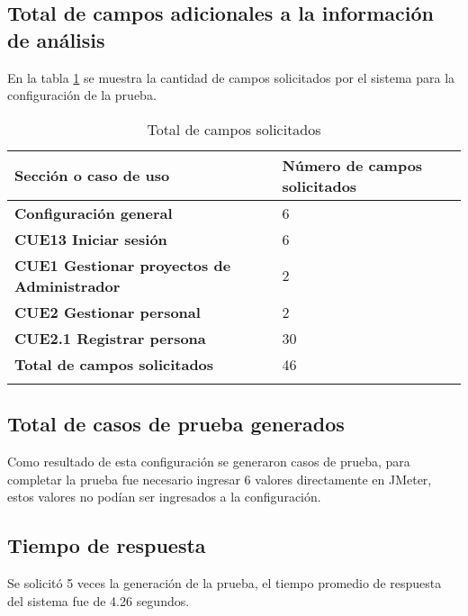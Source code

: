 \subsection*{Total de campos adicionales a la información de análisis}
En la tabla \ref{tabla:resultadosCURegistrarPersona} se muestra la cantidad de campos solicitados por el sistema para la configuración de la prueba.


\begin{longtable}{| p{} | p{} |}%
	\arrayrulecolor{black}%
	\rowcolor{black}%
	{\color{white}Sección o caso de uso} & {\color{white}Número de campos solicitados} \\ \hline
	\endhead%
	\arrayrulecolor{black}%
	{\bf Configuración general} & 6 \\ \hline
	{\bf CUE13 Iniciar sesión} & 6 \\ \hline
	{\bf CUE1 Gestionar proyectos de Administrador} & 2 \\ \hline
	{\bf CUE2 Gestionar personal} & 2 \\ \hline
	{\bf CUE2.1 Registrar persona} & 30 \\ \hline
	{\bf Total de campos solicitados} & 46 \\ \hline
	\caption{Total de campos solicitados}\label{tabla:resultadosCURegistrarPersona}
\end{longtable}

\subsection*{Total de casos de prueba generados}
Como resultado de esta configuración se generaron \totalCasosPruebaCURegistrarPersona casos de prueba, para completar la prueba
fue necesario ingresar 6 valores directamente en JMeter, estos valores no podían ser ingresados a la configuración. 

\subsection*{Tiempo de respuesta}
Se solicitó 5 veces la generación de la prueba, el tiempo promedio de respuesta del sistema fue de 4.26 segundos.


